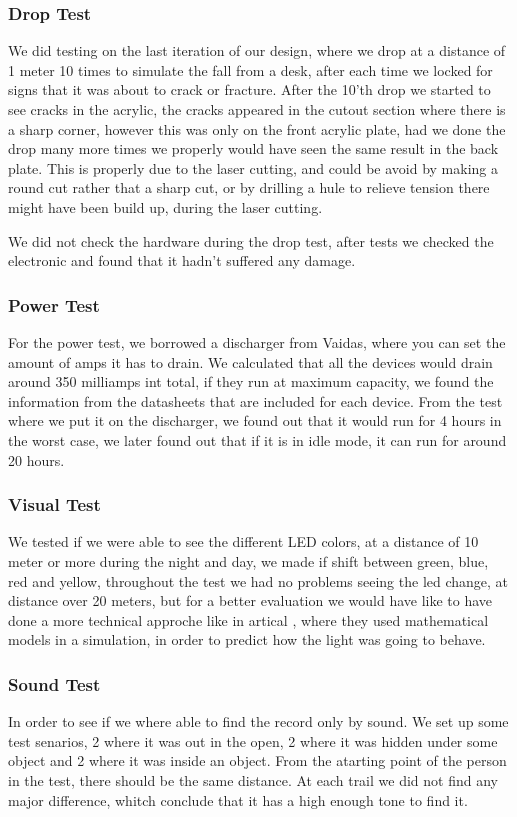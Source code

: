 \subsubsection{Drop Test}
We did testing on the last iteration of our design, where we drop at a distance of 1 meter 10 times to simulate the fall from a desk, after each time we locked for signs that it was about to crack or fracture.
After the 10'th drop we started to see cracks in the acrylic, the cracks appeared in the cutout section where there is a sharp corner, however this was only on the front acrylic plate, had we done the drop many more times we properly would have seen the same result in the back plate.
This is properly due to the laser cutting, and could be avoid by making a round cut rather that a sharp cut, or by drilling a hule to relieve tension there might have been build up, during the laser cutting.

We did not check the hardware during the drop test, after tests we checked the electronic and found that it hadn't suffered any damage.

\subsubsection{Power Test}
For the power test, we borrowed a discharger from Vaidas, where you can set the amount of amps it has to drain.
We calculated that all the devices would drain around 350 milliamps int total, if they run at maximum capacity, we found the information from the datasheets that are included for each device.
From the test where we put it on the discharger, we found out that it would run for 4 hours in the worst case, we later found out that if it is in idle mode, it can run for around 20 hours.

\subsubsection{Visual Test}
We tested if we were able to see the different LED colors, at a distance of 10 meter or more during the night and day, we made if shift between green, blue, red and yellow, throughout the test we had no problems seeing the led change, at distance over 20 meters, but for a better evaluation we would have like to have done a more technical approche like in artical \cite{LEDLIGHT}, where they used mathematical models in a simulation, in order to predict how the light was going to behave.

\subsubsection{Sound Test}
In order to see if we where able to find the record only by sound.
We set up some test senarios, 2 where it was out in the open, 2 where it was hidden under some object and 2 where it was inside an object. From the atarting point of the person in the test, there should be the same distance.
At each trail we did not find any major difference, whitch conclude that it has a high enough tone to find it.

